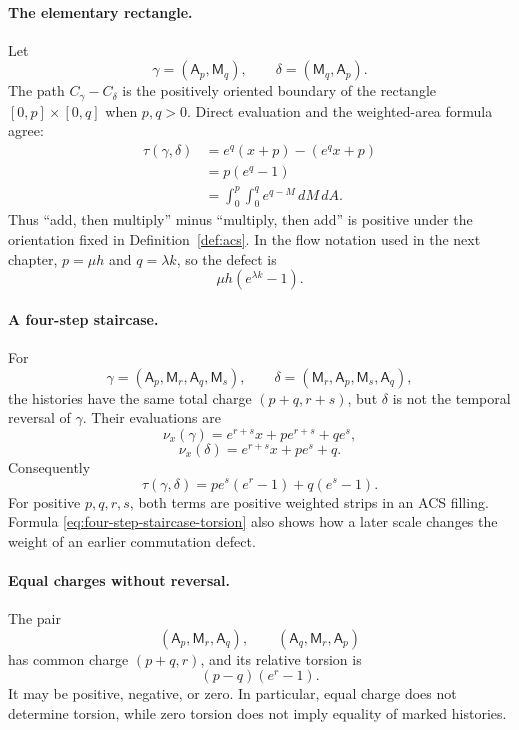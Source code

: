 \paragraph{The elementary rectangle.}
Let
\[
    \gamma=(\mathsf A_p,\mathsf M_q),
    \qquad
    \delta=(\mathsf M_q,\mathsf A_p).
\]
The path \(C_\gamma-C_\delta\) is the positively oriented boundary of the
rectangle \([0,p]\times[0,q]\) when \(p,q>0\).  Direct evaluation and the
weighted-area formula agree:
\begin{align*}
    \tau(\gamma,\delta)
      &=e^q(x+p)-(e^q x+p)\\
      &=p(e^q-1)\\
      &=\int_0^p\int_0^q e^{q-M}\,dM\,dA.
\end{align*}
Thus ``add, then multiply'' minus ``multiply, then add'' is positive under the
orientation fixed in Definition~\ref{def:acs}.  In the flow notation used in
the next chapter, \(p=\mu h\) and \(q=\lambda k\), so the defect is
\[
    \mu h(e^{\lambda k}-1).
\]

\paragraph{A four-step staircase.}
For
\[
    \gamma=(\mathsf A_p,\mathsf M_r,\mathsf A_q,\mathsf M_s),
    \qquad
    \delta=(\mathsf M_r,\mathsf A_p,\mathsf M_s,\mathsf A_q),
\]
the histories have the same total charge \((p+q,r+s)\), but \(\delta\) is not
the temporal reversal of \(\gamma\).  Their evaluations are
\[
    \nu_x(\gamma)=e^{r+s}x+p e^{r+s}+q e^s,
\]
\[
    \nu_x(\delta)=e^{r+s}x+p e^s+q.
\]
Consequently
\begin{equation}
    \tau(\gamma,\delta)
      =p e^s(e^r-1)+q(e^s-1).
    \label{eq:four-step-staircase-torsion}
\end{equation}
For positive \(p,q,r,s\), both terms are positive weighted strips in an ACS
filling.  Formula \eqref{eq:four-step-staircase-torsion} also shows how a later
scale changes the weight of an earlier commutation defect.

\paragraph{Equal charges without reversal.}
The pair
\[
    (\mathsf A_p,\mathsf M_r,\mathsf A_q),
    \qquad
    (\mathsf A_q,\mathsf M_r,\mathsf A_p)
\]
has common charge \((p+q,r)\), and its relative torsion is
\[
    (p-q)(e^r-1).
\]
It may be positive, negative, or zero.  In particular, equal charge does not
determine torsion, while zero torsion does not imply equality of marked
histories.

